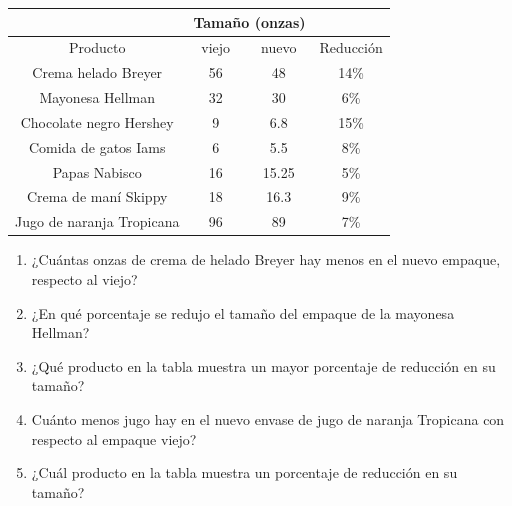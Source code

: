 \documentclass[fleqn]{article}
\begin{document}
\begin{enumerate}
\begin{tabular}{|c|c|c|c|}
\hline 
 & \multicolumn{2}{c}{Tamaño (onzas)}  &  \\ 
\hline 
Producto & viejo & nuevo & Reducción\\ 
\hline 
Crema helado Breyer & 56 & 48 & 14\% \\ 
\hline 
Mayonesa Hellman & 32 & 30 & 6\% \\ 
\hline 
Chocolate negro Hershey & 9 & 6.8 & 15\% \\ 
\hline 
Comida de gatos Iams & 6 & 5.5 & 8\% \\ 
\hline 
Papas Nabisco & 16 & 15.25 & 5\% \\ 
\hline 
Crema de maní Skippy & 18 & 16.3 & 9\% \\ 
\hline 
Jugo de naranja Tropicana & 96 & 89 & 7\% \\ 
\hline 
\end{tabular} 
\begin{enumerate}
\item ¿Cuántas onzas de crema de helado Breyer hay menos en el nuevo empaque, respecto al viejo?\noanswer
\item ¿En qué porcentaje se redujo el tamaño del empaque de la mayonesa Hellman?\noanswer
\item ¿Qué producto en la tabla muestra un mayor porcentaje de reducción en su tamaño?\noanswer
\item Cuánto menos jugo hay en el nuevo envase de jugo de naranja Tropicana con respecto al empaque viejo?\noanswer
\item ¿Cuál producto en la tabla muestra un porcentaje de reducción en su tamaño?\noanswer
\end{enumerate}
 \end{enumerate}
\end{document}
